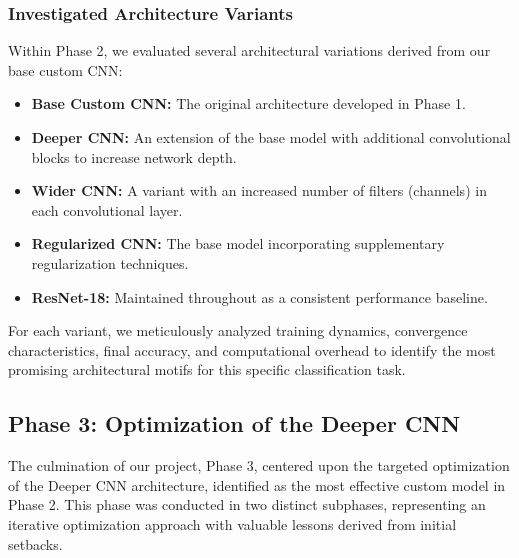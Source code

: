 \subsubsection{Investigated Architecture Variants}
Within Phase 2, we evaluated several architectural variations derived from our base custom CNN:
\begin{itemize}
    \item \textbf{Base Custom CNN:} The original architecture developed in Phase 1.
    \item \textbf{Deeper CNN:} An extension of the base model with additional convolutional blocks to increase network depth.
    \item \textbf{Wider CNN:} A variant with an increased number of filters (channels) in each convolutional layer.
    \item \textbf{Regularized CNN:} The base model incorporating supplementary regularization techniques.
    \item \textbf{ResNet-18:} Maintained throughout as a consistent performance baseline.
\end{itemize}
For each variant, we meticulously analyzed training dynamics, convergence characteristics, final accuracy, and computational overhead to identify the most promising architectural motifs for this specific classification task.


\subsection{Phase 3: Optimization of the Deeper CNN}
The culmination of our project, Phase 3, centered upon the targeted optimization of the Deeper CNN architecture, identified as the most effective custom model in Phase 2. This phase was conducted in two distinct subphases, representing an iterative optimization approach with valuable lessons derived from initial setbacks.

